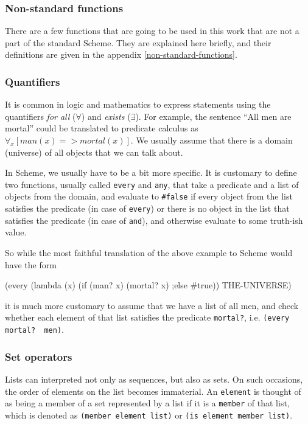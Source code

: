 \subsubsection{Non-standard functions}

There are a few functions that are going to be used in this work
that are not a part of the standard Scheme. They are explained
here briefly, and their definitions are given in the appendix \ref{non-standard-functions}.

\subsubsection{Quantifiers}

It is common in logic and mathematics to express statements using
the quantifiers \textit{for all} ($\forall$) and \textit{exists} ($\exists$).
For example, the sentence ``All men are mortal'' could be translated
to predicate calculus as $\forall_x[man(x) => mortal(x)]$. We usually
assume that there is a domain (universe) of all objects that we can talk
about.

In Scheme, we usually have to be a bit more specific. It is customary
to define two functions, usually called \texttt{every} and \texttt{any},
that take a predicate and a list of objects from the domain, and evaluate
to \texttt{\#false} if every object from the list satisfies the
predicate (in case of \texttt{every}) or there is no object in the list
that satisfies the predicate (in case of \texttt{and}), and otherwise
evaluate to some truth-ish value.

So while the most faithful translation of the above example to Scheme
would have the form
\begin{Snippet}
  (every (lambda (x)
           (if (man? x)
             (mortal? x)
           ;else
             #true))
    THE-UNIVERSE)
\end{Snippet}

it is much more customary to assume that we have a list of all men,
and check whether each element of that list satisfies the predicate
\texttt{mortal?}, i.e. \texttt{(every\,\,mortal?\,\,men)}.

\subsubsection{Set operators}

Lists can interpreted not only as sequences, but also as sets.
On such occasions, the order of elements on the list becomes
immaterial. An \texttt{element} is thought of as being a member of
a set represented by a list if it is a \texttt{member} of that list,
which is denoted as \texttt{(member element list)}
or \texttt{(is element member list)}.

